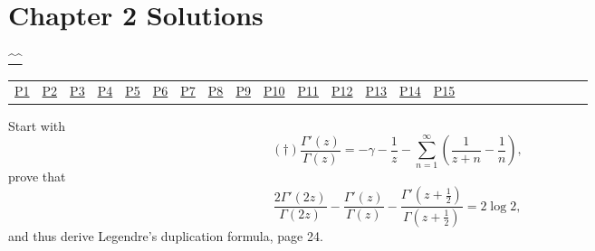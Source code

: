 \section{Chapter 2 Solutions}
\begin{center}\hyperref[toc]{\^{}\^{}}\end{center}
\begin{center}\begin{tabular}{lllllllllllllllllllllllll}
\hyperref[problem1chapter2]{P1} & \hyperref[problem2chapter2]{P2} & \hyperref[problem3chapter2]{P3} & \hyperref[problem4chapter2]{P4} & \hyperref[problem5chapter2]{P5} & \hyperref[problem6chapter2]{P6} & \hyperref[problem7chapter2]{P7} & \hyperref[problem8chapter2]{P8} & \hyperref[problem9chapter2]{P9} & \hyperref[problem10chapter2]{P10} & \hyperref[problem11chapter2]{P11} & \hyperref[problem12chapter2]{P12} & \hyperref[problem13chapter2]{P13} & \hyperref[problem14chapter2]{P14} & \hyperref[problem15chapter2]{P15} & 
\end{tabular}\end{center}
\setcounter{problem}{0}
\setcounter{solution}{0}
\begin{problem}\label{problem1chapter2} %
Start with 
$$(\dagger) \dfrac{\Gamma'(z)}{\Gamma(z)} = -\gamma - \dfrac{1}{z} - \displaystyle\sum_{n=1}^{\infty} \left( \dfrac{1}{z+n} - \dfrac{1}{n} \right),$$
prove that
$$\dfrac{2 \Gamma'(2z)}{\Gamma(2z)} - \dfrac{\Gamma'(z)}{\Gamma(z)} - \dfrac{\Gamma'(z+\frac{1}{2})}{\Gamma(z+\frac{1}{2})} = 2 \log 2,$$
and thus derive Legendre's duplication formula, page 24.
\end{problem}
